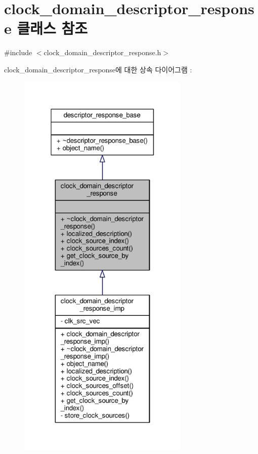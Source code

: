 \hypertarget{classavdecc__lib_1_1clock__domain__descriptor__response}{}\section{clock\+\_\+domain\+\_\+descriptor\+\_\+response 클래스 참조}
\label{classavdecc__lib_1_1clock__domain__descriptor__response}


{\ttfamily \#include $<$clock\+\_\+domain\+\_\+descriptor\+\_\+response.\+h$>$}



clock\+\_\+domain\+\_\+descriptor\+\_\+response에 대한 상속 다이어그램 \+: 
\nopagebreak
\begin{figure}[H]
\begin{center}
\leavevmode
\includegraphics[width=232pt]{classavdecc__lib_1_1clock__domain__descriptor__response__inherit__graph}
\end{center}
\end{figure}


